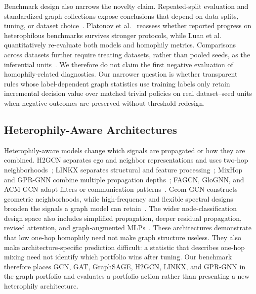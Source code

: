 Benchmark design also narrows the novelty claim. Repeated-split evaluation and standardized graph collections expose conclusions that depend on data splits, tuning, or dataset choice~\cite{shchur2018pitfalls,hu2020ogb}. Platonov et al.~\cite{platonov2023heterophilous} reassess whether reported progress on heterophilous benchmarks survives stronger protocols, while Luan et al.~\cite{luan2024reevaluating} quantitatively re-evaluate both models and homophily metrics. Comparisons across datasets further require treating datasets, rather than pooled seeds, as the inferential units~\cite{demsar2006statistical}. We therefore do not claim the first negative evaluation of homophily-related diagnostics. Our narrower question is whether transparent rules whose label-dependent graph statistics use training labels only retain incremental decision value over matched trivial policies on real dataset--seed units when negative outcomes are preserved without threshold redesign.

\subsection{Heterophily-Aware Architectures}

Heterophily-aware models change which signals are propagated or how they are combined. H2GCN separates ego and neighbor representations and uses two-hop neighborhoods~\cite{zhu2020beyond}; LINKX separates structural and feature processing~\cite{lim2021linkx}; MixHop and GPR-GNN combine multiple propagation depths~\cite{abu2019mixhop,chien2021gprgnn}; FAGCN, GloGNN, and ACM-GCN adapt filters or communication patterns~\cite{fagcn2021,li2022glognn,luan2022linkx}. Geom-GCN constructs geometric neighborhoods, while high-frequency and flexible spectral designs broaden the signals a graph model can retain~\cite{pei2020geomgcn,he2022bernnet,wang2022jacobi}. The wider node-classification design space also includes simplified propagation, deeper residual propagation, revised attention, and graph-augmented MLPs~\cite{wu2019sgc,chen2020gcnii,brody2022gatv2,zhang2021gamlp}. These architectures demonstrate that low one-hop homophily need not make graph structure useless. They also make architecture-specific prediction difficult: a statistic that describes one-hop mixing need not identify which portfolio wins after tuning. Our benchmark therefore places GCN, GAT, GraphSAGE, H2GCN, LINKX, and GPR-GNN in the graph portfolio and evaluates a portfolio action rather than presenting a new heterophily architecture.

